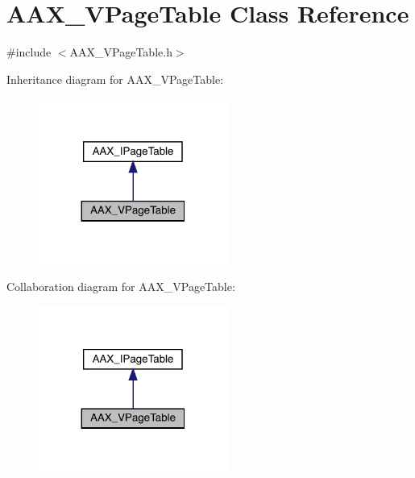 \hypertarget{a01929}{}\section{A\+A\+X\+\_\+\+V\+Page\+Table Class Reference}
\label{a01929}


{\ttfamily \#include $<$A\+A\+X\+\_\+\+V\+Page\+Table.\+h$>$}



Inheritance diagram for A\+A\+X\+\_\+\+V\+Page\+Table\+:
\nopagebreak
\begin{figure}[H]
\begin{center}
\leavevmode
\includegraphics[width=176pt]{a01928}
\end{center}
\end{figure}


Collaboration diagram for A\+A\+X\+\_\+\+V\+Page\+Table\+:
\nopagebreak
\begin{figure}[H]
\begin{center}
\leavevmode
\includegraphics[width=176pt]{a01927}
\end{center}
\end{figure}


